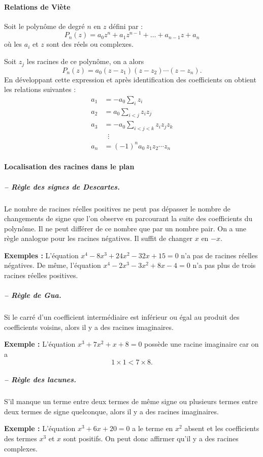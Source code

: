 \paragraph{Relations de Viète}
Soit le polynôme de degré $n$ en $z$ défini par :
\[
  P_n(z) = a_0z^n + a_1z^{n-1} + \dots + a_{n-1}z + a_n
\]
où les $a_i$ et $z$ sont des réels ou complexes.

Soit $z_j$ les racines de ce polynôme, on a alors
\[
  P_n(z) = a_0(z - z_1)(z - z_2)\cdots(z - z_n) .
\]
En développant cette expression et après identification des coefficients on
obtient les relations suivantes :
\[
  \begin{aligned}
    a_1 &= -a_0\sum_i z_i\\
    a_2 &= a_0\sum_{i<j} z_iz_j\\
    a_3 &= -a_0\sum_{i<j<k} z_iz_jz_k\\
    &\;\;\vdots\\
    a_n &= (-1)^n a_0\,z_1z_2\cdots z_n
  \end{aligned}
\]

\paragraph{Localisation des racines dans le plan}

\subparagraph{-- Règle des signes de Descartes.}
Le nombre de racines réelles positives ne peut pas dépasser le nombre de
changements de signe que l'on observe en parcourant la suite des coefficients
du polynôme. Il ne peut différer de ce nombre que par un nombre pair. On a une
règle analogue pour les racines négatives. Il suffit de changer $x$ en $-x$.

\textbf{Exemples :} L'équation $x^4 - 8x^3 + 24x^2 - 32x + 15 = 0$ n'a pas de
racines réelles négatives. De même, l'équation
$x^4 - 2x^3 - 3x^2 + 8x - 4 = 0$ n'a pas plus de trois racines réelles
positives.

\subparagraph{-- Règle de Gua.}
Si le carré d'un coefficient intermédiaire est inférieur ou égal au produit
des coefficients voisins, alors il y a des racines imaginaires.

\textbf{Exemple :} L'équation $x^3 + 7x^2 + x + 8 = 0$ possède une racine
imaginaire car on a
\[
  1 \times 1 < 7 \times 8 .
\]

\subparagraph{-- Règle des lacunes.}
S'il manque un terme entre deux termes de même signe ou plusieurs termes entre
deux termes de signe quelconque, alors il y a des racines imaginaires.

\textbf{Exemple :} L'équation $x^3 + 6x + 20 = 0$ a le terme en $x^2$ absent
et les coefficients des termes $x^3$ et $x$ sont positifs. On peut donc
affirmer qu'il y a des racines complexes.

